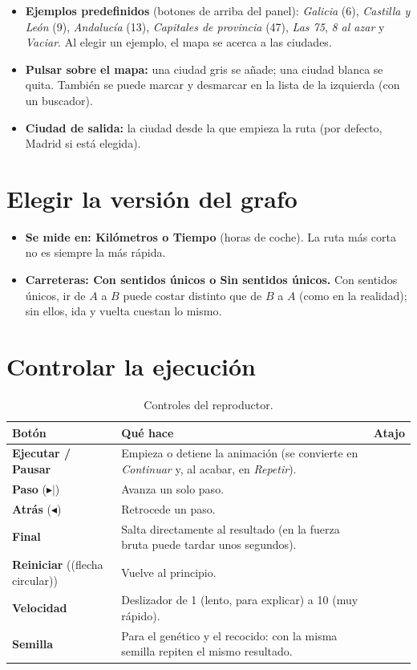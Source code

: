 \documentclass[11pt,a4paper,twoside,openany]{report}
\newcommand{\tecla}[1]{\fbox{\small\texttt{#1}}}
\begin{document}
\begin{itemize}
  \item \textbf{Ejemplos predefinidos} (botones de arriba del panel): \emph{Galicia} (6), \emph{Castilla y León} (9), \emph{Andalucía} (13), \emph{Capitales de provincia} (47), \emph{Las 75}, \emph{8 al azar} y \emph{Vaciar}. Al elegir un ejemplo, el mapa se acerca a las ciudades.
  \item \textbf{Pulsar sobre el mapa:} una ciudad gris se añade; una ciudad blanca se quita. También se puede marcar y desmarcar en la lista de la izquierda (con un buscador).
  \item \textbf{Ciudad de salida:} la ciudad desde la que empieza la ruta (por defecto, Madrid si está elegida).
\end{itemize}

\section{Elegir la versión del grafo}

\begin{itemize}
  \item \textbf{Se mide en: Kilómetros o Tiempo} (horas de coche). La ruta más corta no es siempre la más rápida.
  \item \textbf{Carreteras: Con sentidos únicos o Sin sentidos únicos.} Con sentidos únicos, ir de $A$ a $B$ puede costar distinto que de $B$ a $A$ (como en la realidad); sin ellos, ida y vuelta cuestan lo mismo.
\end{itemize}

\section{Controlar la ejecución}

\begin{table}[htbp]
  \centering
  \caption{Controles del reproductor.}
  \small
  \begin{tabularx}{\linewidth}{@{}l X l@{}}
    \toprule
    Botón & Qué hace & Atajo \\
    \midrule
    \textbf{Ejecutar / Pausar} & Empieza o detiene la animación (se convierte en \emph{Continuar} y, al acabar, en \emph{Repetir}). & \tecla{Espacio} \\
    \textbf{Paso} ($\blacktriangleright|$) & Avanza un solo paso. & \tecla{$\rightarrow$} \\
    \textbf{Atrás} ($\blacktriangleleft$) & Retrocede un paso. & \tecla{$\leftarrow$} \\
    \textbf{Final} & Salta directamente al resultado (en la fuerza bruta puede tardar unos segundos). & \\
    \textbf{Reiniciar} ((flecha circular)) & Vuelve al principio. & \\
    \textbf{Velocidad} & Deslizador de 1 (lento, para explicar) a 10 (muy rápido). & \\
    \textbf{Semilla} & Para el genético y el recocido: con la misma semilla repiten el mismo resultado. & \\
    \bottomrule
  \end{tabularx}
\end{table}
\end{document}
